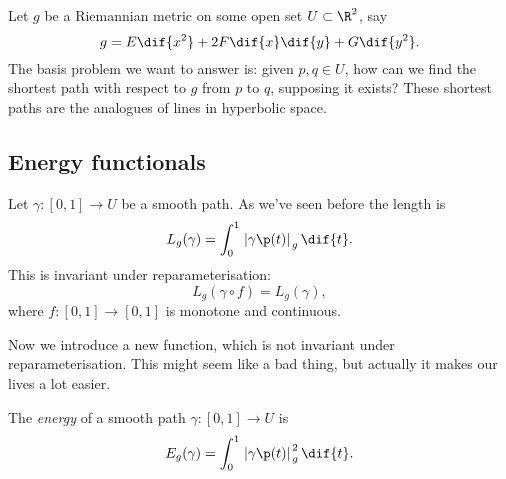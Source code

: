 \setcounter{lecture}{6}

\newcommand{\tgamma}{\tilde{\gamma}}

Let $g$ be a Riemannian metric on some open set $U\subset \R^2$, say
\begin{equation*}
	g = E \dif{x^2} + 2F \dif{x} \dif{y} + G \dif{y^2}.
\end{equation*}
The basis problem we want to answer is: given $p,q\in U$, how can we find the shortest path with respect to $g$ from $p$ to $q$, supposing it exists? These shortest paths are the analogues of lines in hyperbolic space.

\subsection{Energy functionals} %
\label{sub:energy_functionals}

Let $\gamma:[0,1] \to U$ be a smooth path. As we've seen before the length is
\begin{equation*}
	L_g(\gamma) = \int_0^1 \left.|\gamma\p(t)|\right._g \dif{t}.
\end{equation*}
This is invariant under reparameterisation:
\begin{equation*}
	L_g(\gamma\circ f) = L_g(\gamma),
\end{equation*}
where $f:[0,1] \to [0,1]$ is monotone and continuous.

Now we introduce a new function, which is not invariant under reparameterisation. This might seem like a bad thing, but actually it makes our lives a lot easier.

\begin{definition}
	The \emph{energy} of a smooth path $\gamma:[0,1] \to U$ is
	\begin{equation*}
		E_g(\gamma) = \int_0^1 \left.|\gamma\p(t)|\right._g^2 \dif{t}.
	\end{equation*}
\end{definition}

